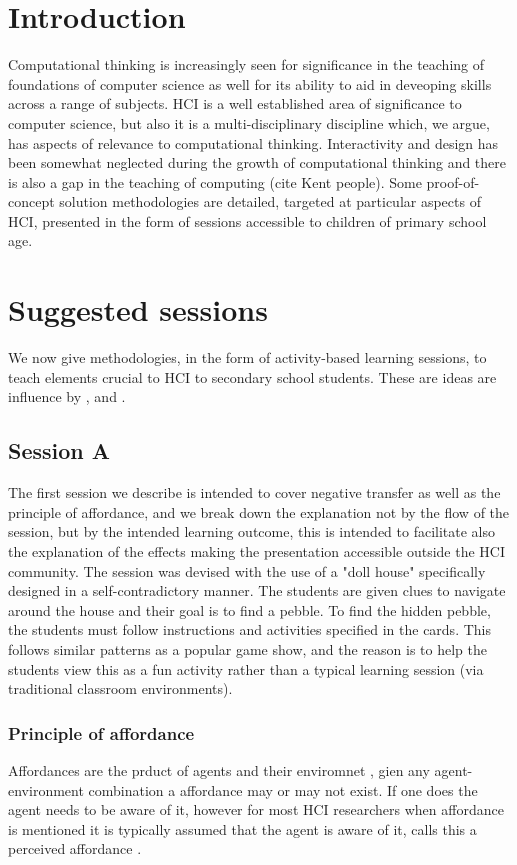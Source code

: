 \documentclass{sig-alternate}
\begin{document}
\section{Introduction}
Computational thinking is increasingly seen for significance in the teaching of foundations of computer science as well for its ability to aid in deveoping skills across a range of subjects.
HCI is a well established area of significance to computer science, but also it is a multi-disciplinary discipline which, we argue, has aspects of relevance to computational thinking. Interactivity and design has been somewhat neglected during the growth of computational thinking and there is also a gap in the teaching of computing (cite Kent people). Some proof-of-concept solution methodologies are detailed, targeted at particular aspects of HCI, presented in the form of sessions accessible to children of primary school age.




 
\section{Suggested sessions}
We now give methodologies, in the form of activity-based learning sessions, to teach elements crucial to HCI to secondary school students. These are ideas are influence by \cite{normanDesign}, \cite{rogers2011interaction} and \cite{shneiderman1986designing}.
\subsection{Session A}
The first session we describe is intended to cover negative transfer as well as the principle of affordance, and we break down the explanation not by the flow of the session, but by the intended learning outcome, this is intended to facilitate also the explanation of the effects making the presentation accessible outside the HCI community. The session was devised with the use of a "doll house" specifically designed in a self-contradictory manner. The students are given clues to navigate around the house and their goal is to find a pebble. To find the hidden pebble, the students must follow instructions and activities specified in the cards. This follows similar patterns as a popular game show, and the reason is to help the students view this as a fun activity rather than a typical learning session (via traditional classroom environments).

\subsubsection*{Principle of affordance}
Affordances are the prduct of agents and their enviromnet \cite{gibson1977theory}, gien any agent-environment combination a affordance may or may not exist. If one does the agent needs to be aware of it, however for most HCI researchers when affordance is mentioned it is typically assumed that the agent is aware of it,  calls this a perceived affordance \cite{norman1999affordance}.
\end{document}
